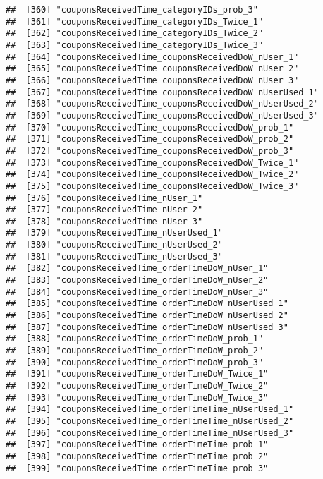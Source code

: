 \documentclass[10pt]{report}
\begin{document}
\begin{verbatim}
##  [360] "couponsReceivedTime_categoryIDs_prob_3"               
##  [361] "couponsReceivedTime_categoryIDs_Twice_1"              
##  [362] "couponsReceivedTime_categoryIDs_Twice_2"              
##  [363] "couponsReceivedTime_categoryIDs_Twice_3"              
##  [364] "couponsReceivedTime_couponsReceivedDoW_nUser_1"       
##  [365] "couponsReceivedTime_couponsReceivedDoW_nUser_2"       
##  [366] "couponsReceivedTime_couponsReceivedDoW_nUser_3"       
##  [367] "couponsReceivedTime_couponsReceivedDoW_nUserUsed_1"   
##  [368] "couponsReceivedTime_couponsReceivedDoW_nUserUsed_2"   
##  [369] "couponsReceivedTime_couponsReceivedDoW_nUserUsed_3"   
##  [370] "couponsReceivedTime_couponsReceivedDoW_prob_1"        
##  [371] "couponsReceivedTime_couponsReceivedDoW_prob_2"        
##  [372] "couponsReceivedTime_couponsReceivedDoW_prob_3"        
##  [373] "couponsReceivedTime_couponsReceivedDoW_Twice_1"       
##  [374] "couponsReceivedTime_couponsReceivedDoW_Twice_2"       
##  [375] "couponsReceivedTime_couponsReceivedDoW_Twice_3"       
##  [376] "couponsReceivedTime_nUser_1"                          
##  [377] "couponsReceivedTime_nUser_2"                          
##  [378] "couponsReceivedTime_nUser_3"                          
##  [379] "couponsReceivedTime_nUserUsed_1"                      
##  [380] "couponsReceivedTime_nUserUsed_2"                      
##  [381] "couponsReceivedTime_nUserUsed_3"                      
##  [382] "couponsReceivedTime_orderTimeDoW_nUser_1"             
##  [383] "couponsReceivedTime_orderTimeDoW_nUser_2"             
##  [384] "couponsReceivedTime_orderTimeDoW_nUser_3"             
##  [385] "couponsReceivedTime_orderTimeDoW_nUserUsed_1"         
##  [386] "couponsReceivedTime_orderTimeDoW_nUserUsed_2"         
##  [387] "couponsReceivedTime_orderTimeDoW_nUserUsed_3"         
##  [388] "couponsReceivedTime_orderTimeDoW_prob_1"              
##  [389] "couponsReceivedTime_orderTimeDoW_prob_2"              
##  [390] "couponsReceivedTime_orderTimeDoW_prob_3"              
##  [391] "couponsReceivedTime_orderTimeDoW_Twice_1"             
##  [392] "couponsReceivedTime_orderTimeDoW_Twice_2"             
##  [393] "couponsReceivedTime_orderTimeDoW_Twice_3"             
##  [394] "couponsReceivedTime_orderTimeTime_nUserUsed_1"        
##  [395] "couponsReceivedTime_orderTimeTime_nUserUsed_2"        
##  [396] "couponsReceivedTime_orderTimeTime_nUserUsed_3"        
##  [397] "couponsReceivedTime_orderTimeTime_prob_1"             
##  [398] "couponsReceivedTime_orderTimeTime_prob_2"             
##  [399] "couponsReceivedTime_orderTimeTime_prob_3"             

\end{verbatim}
\end{document}
